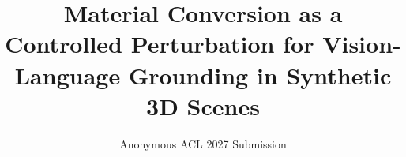 \documentclass[11pt]{article}
\title{Material Conversion as a Controlled Perturbation for Vision-Language Grounding in Synthetic 3D Scenes}
\author{Anonymous ACL 2027 Submission}
\begin{document}
\maketitle






\FloatBarrier



\FloatBarrier




\end{document}
